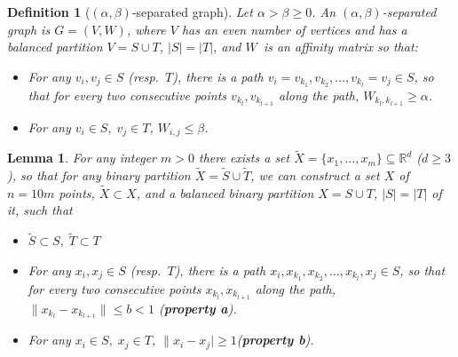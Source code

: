 \documentclass{article} %
\newtheorem{lemma}[theorem]{Lemma}
\newtheorem{definition}[theorem]{Definition}
\begin{document}
\begin{definition}[$(\alpha,\beta)$-separated graph] Let $\alpha > \beta \ge 0$. An $(\alpha,\beta)$-separated graph is $G=(V,W)$, where  $V$ has an even number of vertices and has a balanced partition $V = S \cup T$, $|S| = |T|$, and $W$\ is an affinity matrix so that:
\begin{itemize}
\item For any $v_i,v_j \in S$ (resp.~$T$), there is a path $v_i=v_{k_1},v_{k_2},\ldots, v_{k_l}=v_j \in S$, so that for every two consecutive points $v_{k_l},v_{k_{l+1}}$  along the path, $W_{{k_l},{k_{l+1}}} \ge \alpha$.
\item For any $v_i \in S,\; v_j \in T$, $W_{i,j}  \le \beta$.
\end{itemize}

\end{definition}


\begin{lemma} \label{lem:a-b}
For any integer $m>0 $ there exists a set $\tilde{X} = \{x_1,\ldots,x_m\}\subseteq \mathbb{R}^d$ ($d \ge 3$), so that for any binary partition $\tilde{X}= \tilde{S}\cup \tilde{T}$, we can construct a set $X$ of $n=10m$ points, $\tilde{X} \subset X$, and a balanced binary partition $X = S\cup T$, $|S| = |T|$ of it, such that
\begin{itemize}
\item $\tilde{S} \subset S,\; \tilde{T} \subset T$
\item For any $x_i,x_j \in S$ (resp.~$T$), there is a path $x_i,x_{k_1},x_{k_2},\ldots, x_{k_l},x_j \in S$, so that for every two consecutive points $x_{k_l},x_{k_{l+1}}$  along the path, $\|x_{k_l}-x_{k_{l+1}}\| \le b <1$ (\textbf{property a}).
\item For any $x_i \in S,\; x_j \in T$, $\|x_i-x_j|  \ge 1$(\textbf{property b}).
\end{itemize}
\end{lemma}
\end{document}
